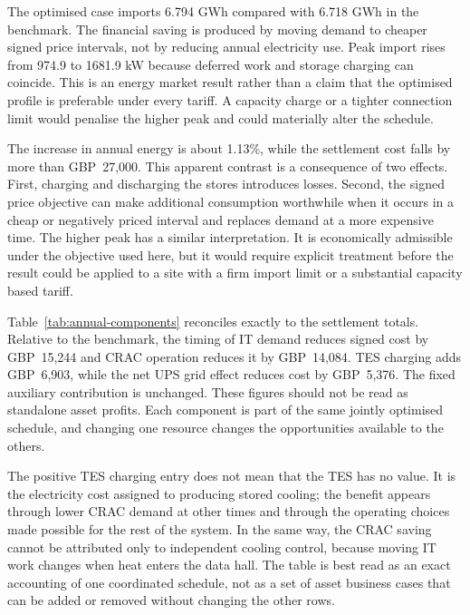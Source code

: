 

The optimised case imports 6.794 GWh compared with 6.718 GWh in the benchmark.
The financial saving is produced by moving demand to cheaper signed
price intervals, not by reducing annual electricity use. Peak import rises from
974.9 to 1681.9 kW because deferred work and storage charging can coincide. This
is an energy market result rather than a claim that the optimised profile is
preferable under every tariff. A capacity charge or a tighter connection limit
would penalise the higher peak and could materially alter the schedule.

The increase in annual energy is about 1.13\%, while the settlement cost falls by
more than GBP~27,000. This apparent contrast is a consequence of two effects.
First, charging and discharging the stores introduces losses. Second, the signed
price objective can make additional consumption worthwhile when it occurs in a
cheap or negatively priced interval and replaces demand at a more expensive
time. The higher peak has a similar interpretation. It is economically admissible
under the objective used here, but it would require explicit treatment before
the result could be applied to a site with a firm import limit or a substantial
capacity based tariff.



Table~\ref{tab:annual-components} reconciles exactly to the settlement totals.
Relative to the benchmark, the timing of IT demand reduces signed cost by
GBP~15,244 and CRAC operation reduces it by GBP~14,084. TES charging adds
GBP~6,903, while the net UPS grid effect reduces cost by GBP~5,376. The fixed
auxiliary contribution is unchanged. These figures should not be read as
standalone asset profits. Each component is part of the same jointly optimised
schedule, and changing one resource changes the opportunities available to the
others.

The positive TES charging entry does not mean that the TES has no value. It is
the electricity cost assigned to producing stored cooling; the benefit appears
through lower CRAC demand at other times and through the operating choices made
possible for the rest of the system. In the same way, the CRAC saving cannot be
attributed only to independent cooling control, because moving IT work changes
when heat enters the data hall. The table is best read as an exact accounting of
one coordinated schedule, not as a set of asset business cases that can be added
or removed without changing the other rows.


